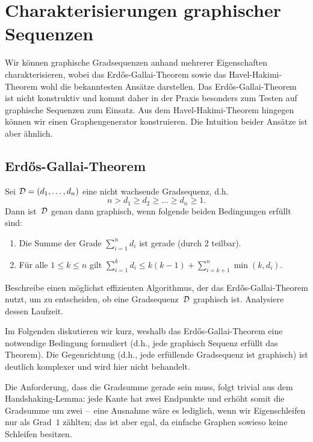\section{Charakterisierungen graphischer Sequenzen}
Wir können graphische Gradsequenzen anhand mehrerer Eigenschaften charakterisieren, wobei das Erd\H{o}s-Gallai-Theorem sowie das Havel-Hakimi-Theorem wohl die bekanntesten Ansätze darstellen.
Das Erd\H{o}s-Gallai-Theorem ist nicht konstruktiv und kommt daher in der Praxis besonders zum Testen auf graphische Sequenzen zum Einsatz.
Aus dem Havel-Hakimi-Theorem hingegen können wir einen Graphengenerator konstruieren.
Die Intuition beider Ansätze ist aber ähnlich.

\subsection{Erd\H{o}s-Gallai-Theorem}
\begin{theorem}
    Sei $\mathcal{D} = (d_1, \ldots, d_n)$ eine nicht wachsende Gradsequenz, d.h.
    \begin{equation}
        n > d_1 \ge d_2 \ge \ldots \ge d_n \ge 1.
    \end{equation}
    Dann ist~$\mathcal{D}$ genau dann graphisch, wenn folgende beiden Bedingungen erfüllt sind:
    \begin{enumerate}
        \item Die Summe der Grade $\sum_{i=1}^n d_i$ ist gerade (durch 2 teilbar).
        \item Für alle $1 \le k \le n$ gilt $\sum_{i=1}^k d_i \le k(k-1) + \sum_{i=k+1}^n \min(k, d_i)$. \qedhere
    \end{enumerate}
\end{theorem}

\begin{exercise}
    Beschreibe einen möglichst effizienten Algorithmus, der das Erd\H{o}s-Gallai-Theorem nutzt, um zu entscheiden, ob eine Gradsequenz~$\mathcal{D}$ graphisch ist.
    Analysiere dessen Laufzeit.
\end{exercise}

Im Folgenden diskutieren wir kurz, weshalb das Erd\H{o}s-Gallai-Theorem eine notwendige Bedingung formuliert (d.h., jede graphisch Sequenz erfüllt das Theorem).
Die Gegenrichtung (d.h., jede erfüllende Gradsequenz ist graphisch) ist deutlich komplexer und wird hier nicht behandelt.

Die Anforderung, dass die Gradsumme gerade sein muss, folgt trivial aus dem Handshaking-Lemma:
jede Kante hat zwei Endpunkte und erhöht somit die Gradsumme um zwei
--~eine Ausnahme wäre es lediglich, wenn wir Eigenschleifen nur als Grad~$1$ zählten; das ist aber egal, da einfache Graphen sowieso keine Schleifen besitzen.

